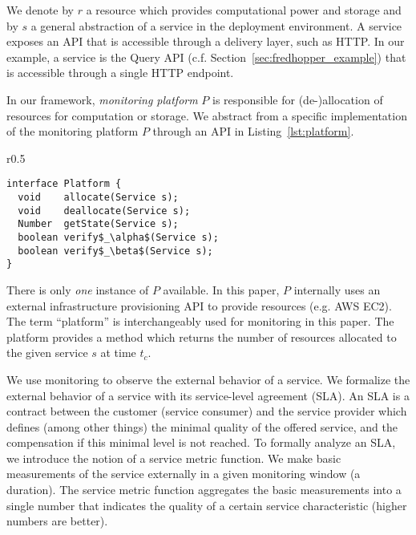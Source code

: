 We denote by $r$ a resource which provides computational power and storage
and by $s$ a general abstraction of a service in the deployment environment. 
A service exposes an API that is accessible through a delivery layer, such as HTTP.
In our example, a service is the Query API (c.f. Section~\ref{sec:fredhopper_example}) that is accessible through a single HTTP endpoint.

In our framework, 
\emph{monitoring platform}  $P$ is responsible for (de-)allocation of resources for computation or storage.
We abstract from a specific implementation of the monitoring platform $P$ through an API in Listing~\ref{lst:platform}. 
% 
\lstset{language=java,aboveskip=-20pt,belowskip=-20pt}
\begin{wrapfigure}{r}{0.5\textwidth}
\begin{center}
\begin{lstlisting}[mathescape,caption=Platform API,label=lst:platform]
interface Platform {
  void    allocate(Service s);
  void    deallocate(Service s);
  Number  getState(Service s);
  boolean verify$_\alpha$(Service s);
  boolean verify$_\beta$(Service s);
}
\end{lstlisting}
\end{center}   
\end{wrapfigure}
\lstset{mathescape=false}
% 
There is only \emph{one} instance of $P$ available.
In this paper, $P$ internally uses an external infrastructure provisioning API to provide resources (e.g. AWS EC2).
The term ``platform'' is interchangeably used for monitoring in this paper.
The platform provides a method  which returns
the number of resources allocated to the given service $s$ at time $t_c$.

We use monitoring to observe the external behavior of a service.
We formalize the external behavior of a service with its service-level agreement (SLA).
An SLA is a contract between the customer (service consumer) and the service provider
which defines (among other things) the minimal quality of the offered service,
and the compensation if this minimal level is not reached.
To formally analyze an SLA, we introduce the notion of a service metric function.
We make basic measurements of the service externally in a given monitoring window (a duration).
The service metric function aggregates the basic measurements into a single number
that indicates the quality of a certain service characteristic (higher numbers are better).
%

